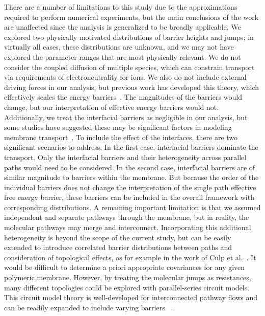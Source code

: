 \documentclass[12pt]{article}
\begin{document}
There are a number of limitations to this study due to the approximations required to perform numerical experiments, but the main conclusions of the work are unaffected since the analysis is generalized to be broadly applicable. We explored two physically motivated distributions of barrier heights and jumps; in virtually all cases, these distributions are unknown, and we may not have explored the parameter ranges that are most physically relevant. We do not consider the coupled diffusion of multiple species, which can constrain transport via requirements of electroneutrality for ions. We also do not include external driving forces in our analysis, but previous work has developed this theory, which effectively scales the energy barriers~\cite{zwolinski_diffusion_1949,del_castillo_energy-barrier_1979}. The magnitudes of the barriers would change, but our interpretation of effective energy barriers would not. Additionally, we treat the interfacial barriers as negligible in our analysis, but some studies have suggested these may be significant factors in modeling membrane transport~\cite{kingsbury_kinetic_2024}. To include the effect of the interfaces, there are two significant scenarios to address. In the first case, interfacial barriers dominate the transport. Only the interfacial barriers and their heterogeneity across parallel paths would need to be considered. In the second case, interfacial barriers are of similar magnitude to barriers within the membrane. But because the order of the individual barriers does not change the interpretation of the single path effective free energy barrier, these barriers can be included in the overall framework with corresponding distributions. A remaining important limitation is that we assumed independent and separate pathways through the membrane, but in reality, the molecular pathways may merge and interconnect. Incorporating this additional heterogeneity is beyond the scope of the current study, but can be easily extended to introduce correlated barrier distributions between paths and consideration of topological effects, as for example in the work of Culp et al.~\cite{culp_nanoscale_2021}. It would be difficult to determine a priori appropriate covariances for any given polymeric membrane. However, by treating the molecular jumps as resistances, many different topologies could be explored with parallel-series circuit models. This circuit model theory is well-developed for interconnected pathway flows and can be readily expanded to include varying barriers ~\cite{mishra_effective_2021,zhang_equivalent_2019,tan_resistance_2017,tan_equivalent_2013}. 
\end{document}
